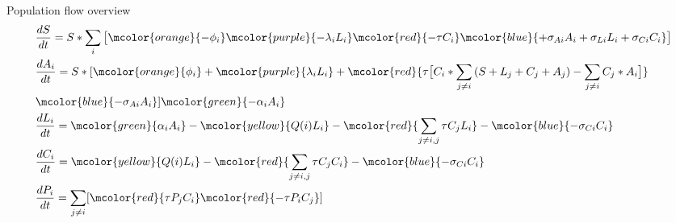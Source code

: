 \begin{frame}{Population flow overview}
    \begin{equation}
    \begin{aligned}
         & \frac{dS}{dt} = S * \sum_i \big[\mcolor{orange}{- \phi_i} \mcolor{purple}{- \lambda_iL_i} \mcolor{red}{- \tau C_i} \mcolor{blue}{+ \sigma_{Ai}A_i + \sigma_{Li}L_i + \sigma_{Ci}C_i} \big] \\
         & \frac{dA_i}{dt} = S * [\mcolor{orange}{\phi_i} + \mcolor{purple}{\lambda_iL_i} + \mcolor{red}{\tau \big[ C_i * \sum_{j \neq i}{(S + L_j + C_j + A_j)} - \sum_{j \neq i}{C_j * A_i} \big] } \\ & \mcolor{blue}{- \sigma_{Ai}A_i}] \mcolor{green}{- \alpha_iA_i} \\
        & \frac{dL_i}{dt} = \mcolor{green}{\alpha_iA_i} - \mcolor{yellow}{Q(i)L_i} - \mcolor{red}{\sum_{j \neq i, j} \tau C_jL_i} - \mcolor{blue}{- \sigma_{Ci}C_i} \\
        & \frac{dC_i}{dt} = \mcolor{yellow}{Q(i)L_i} - \mcolor{red}{\sum_{j \neq i, j} \tau C_jC_i} - \mcolor{blue}{- \sigma_{Ci}C_i} \\
        & \frac{dP_i}{dt} = \sum_{j \neq i} [\mcolor{red}{\tau P_j C_i} \mcolor{red}{- \tau P_i C_j}] \\
    \end{aligned}
    \end{equation}

\end{frame}
